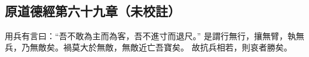 ﻿%
%

\chapter{~}

\section{原道德經第六十九章（未校註）}

\begin{withgezhu}

\zhsong


用兵有言曰：“吾不敢為主而為客，吾不進寸而退尺。”
是謂行無行，攘無臂，執無兵，乃無敵矣。禍莫大於無敵，無敵近亡吾寶矣。
故抗兵相若，則哀者勝矣。

\end{withgezhu}

